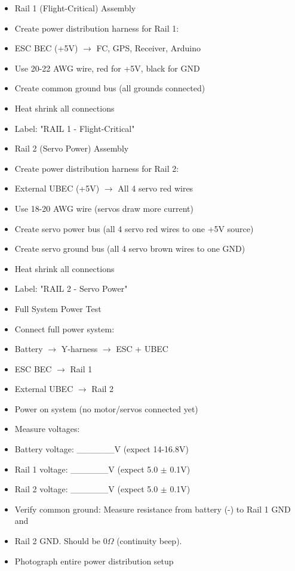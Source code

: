 \documentclass[11pt,letterpaper]{article}
\begin{document}
\begin{itemize}
  \item Rail 1 (Flight-Critical) Assembly
  \item Create power distribution harness for Rail 1:
  \item ESC BEC (+5V) $\rightarrow$ FC, GPS, Receiver, Arduino
  \item Use 20-22 AWG wire, red for +5V, black for GND
  \item Create common ground bus (all grounds connected)
  \item Heat shrink all connections
  \item Label: "RAIL 1 - Flight-Critical"
\end{itemize}

\begin{itemize}
  \item Rail 2 (Servo Power) Assembly
  \item Create power distribution harness for Rail 2:
  \item External UBEC (+5V) $\rightarrow$ All 4 servo red wires
  \item Use 18-20 AWG wire (servos draw more current)
  \item Create servo power bus (all 4 servo red wires to one +5V source)
  \item Create servo ground bus (all 4 servo brown wires to one GND)
  \item Heat shrink all connections
  \item Label: "RAIL 2 - Servo Power"
\end{itemize}

\begin{itemize}
  \item Full System Power Test
  \item Connect full power system:
  \item Battery $\rightarrow$ Y-harness $\rightarrow$ ESC + UBEC
  \item ESC BEC $\rightarrow$ Rail 1
  \item External UBEC $\rightarrow$ Rail 2
  \item Power on system (no motor/servos connected yet)
  \item Measure voltages:
  \item Battery voltage: \_\_\_\_\_\_V (expect 14-16.8V)
  \item Rail 1 voltage: \_\_\_\_\_\_V (expect 5.0 $\pm$ 0.1V)
  \item Rail 2 voltage: \_\_\_\_\_\_V (expect 5.0 $\pm$ 0.1V)
  \item Verify common ground: Measure resistance from battery (-) to Rail 1 GND and
  \item Rail 2 GND. Should be 0$\Omega$ (continuity beep).
  \item Photograph entire power distribution setup
\end{itemize}
\end{document}
